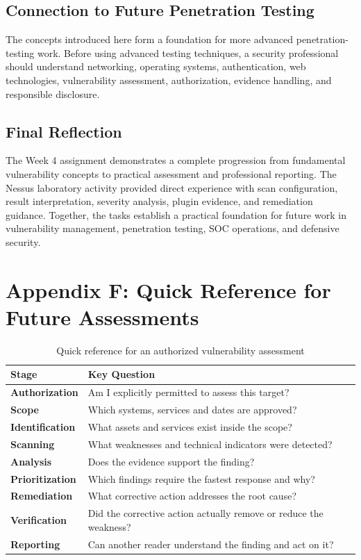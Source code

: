 \documentclass[11pt,a4paper]{article}
\begin{document}
\subsection{Connection to Future Penetration Testing}
The concepts introduced here form a foundation for more advanced penetration-testing work. Before using advanced testing techniques, a security professional should understand networking, operating systems, authentication, web technologies, vulnerability assessment, authorization, evidence handling, and responsible disclosure.

\subsection{Final Reflection}
The Week 4 assignment demonstrates a complete progression from fundamental vulnerability concepts to practical assessment and professional reporting. The Nessus laboratory activity provided direct experience with scan configuration, result interpretation, severity analysis, plugin evidence, and remediation guidance. Together, the tasks establish a practical foundation for future work in vulnerability management, penetration testing, SOC operations, and defensive security.


\newpage
\section{Appendix F: Quick Reference for Future Assessments}
\begin{table}[H]\centering
\small
\begin{tabularx}{\textwidth}{>{\bfseries}p{4.0cm}X}
\toprule
Stage & Key Question\\
\midrule
Authorization & Am I explicitly permitted to assess this target?\\
Scope & Which systems, services and dates are approved?\\
Identification & What assets and services exist inside the scope?\\
Scanning & What weaknesses and technical indicators were detected?\\
Analysis & Does the evidence support the finding?\\
Prioritization & Which findings require the fastest response and why?\\
Remediation & What corrective action addresses the root cause?\\
Verification & Did the corrective action actually remove or reduce the weakness?\\
Reporting & Can another reader understand the finding and act on it?\\
\bottomrule
\end{tabularx}
\caption{Quick reference for an authorized vulnerability assessment}
\end{table}
\end{document}
